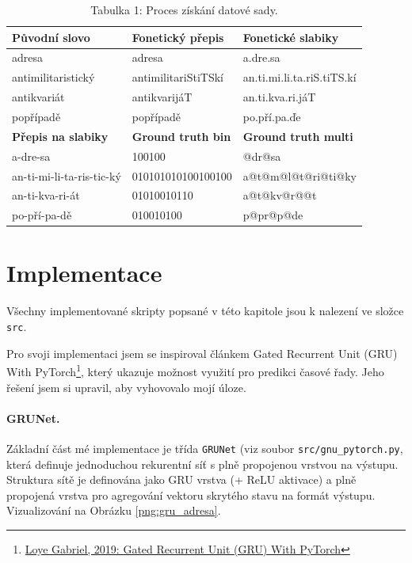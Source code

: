 \documentclass[a4paper]{article}
\theoremstyle{definition}
\begin{document}
\begin{table}[]
\centering
\caption{Tabulka 1: Proces získání datové sady.}
\begin{tabular}{|l|l|l|}
\hline
\textbf{Původní slovo}     & \textbf{Fonetický přepis}    & \textbf{Fonetické slabiky} \\ \hline
adresa                     & adresa                       & a.dre.sa                   \\ \hline
antimilitaristický         & antimilitariStiTSkí          & an.ti.mi.li.ta.riS.tiTS.kí \\ \hline
antikvariát                & antikvarijáT                 & an.ti.kva.ri.jáT           \\ \hline
popřípadě                  & popřípadě                    & po.pří.pa.ďe               \\ \hline
\textbf{Přepis na slabiky} & \textbf{Ground truth bin}    & \textbf{Ground truth multi}      \\ \hline
a-dre-sa                   & 100100                       & @dr@sa                     \\ \hline
an-ti-mi-li-ta-ris-tic-ký  & 010101010100100100           & a@t@m@l@t@ri@ti@ky         \\ \hline
an-ti-kva-ri-át            & 01010010110                  & a@t@kv@r@@t                \\ \hline
po-pří-pa-dě               & 010010100                    & p@pr@p@de                  \\ \hline
\end{tabular}
\label{table:dataset}
\end{table}

\section{Implementace}
Všechny implementované skripty popsané v této kapitole jsou k nalezení ve složce \texttt{src}.

Pro svoji implementaci jsem se inspiroval článkem Gated Recurrent Unit (GRU) With PyTorch\footnote{\href{https://blog.floydhub.com/gru-with-pytorch/}{Loye Gabriel, 2019: Gated Recurrent Unit (GRU) With PyTorch}}, který ukazuje možnost využití pro predikci časové řady. Jeho řešení jsem si upravil, aby vyhovovalo mojí úloze.

\paragraph{GRUNet.}
Základní část mé implementace je třída \texttt{GRUNet} (viz soubor \texttt{src/gnu\_pytorch.py}, která definuje jednoduchou rekurentní síť s plně propojenou vrstvou na výstupu. Struktura sítě je definována jako GRU vrstva (+ ReLU aktivace) a plně propojená vrstva pro agregování vektoru skrytého stavu na formát výstupu. Vizualizování na Obrázku \ref{png:gru_adresa}.
\end{document}
